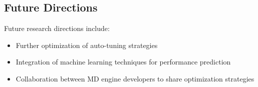 \documentclass[conference]{IEEEtran}
\begin{document}
\subsection{Future Directions}

Future research directions include:
\begin{itemize}
    \item Further optimization of auto-tuning strategies
    \item Integration of machine learning techniques for performance prediction
    \item Collaboration between MD engine developers to share optimization strategies
\end{itemize}

\cite{Gratl2019AutoPasAF}







\newpage
\newpage
\tableofcontents
\end{document}
